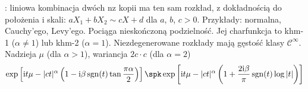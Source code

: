 : liniowa kombinacja dwóch nz kopii ma ten sam rozkład, z dokładnością do położenia i skali: $aX_1 + bX_2 \sim cX + d$ dla $a$, $b$, $c > 0$.
Przykłady: normalna, Cauchy'ego, Levy'ego.
Pociąga nieskończoną podzielność.
Jej charfunkcja to khm-1 ($\alpha \neq 1$) lub khm-2 ($\alpha = 1$).
Niezdegenerowane rozkłady mają gęstość klasy $\mathscr C^\infty$.
Nadzieja $\mu$ (dla $\alpha > 1$), wariancja $2c \cdot c$ (dla $\alpha = 2$)
\[
	\exp \left[\textrm{i}t\mu - |ct|^\alpha  \left(1 - \textrm{i} \beta \operatorname{sgn}(t) \tan \frac {\pi \alpha} 2\right) \right] \spk
	\exp \left[\textrm{i}t\mu - |ct|^\alpha \left(1 +  \frac{2 \textrm{i} \beta}{\pi} \operatorname{sgn}(t) \log |t|\right) \right] 
\]